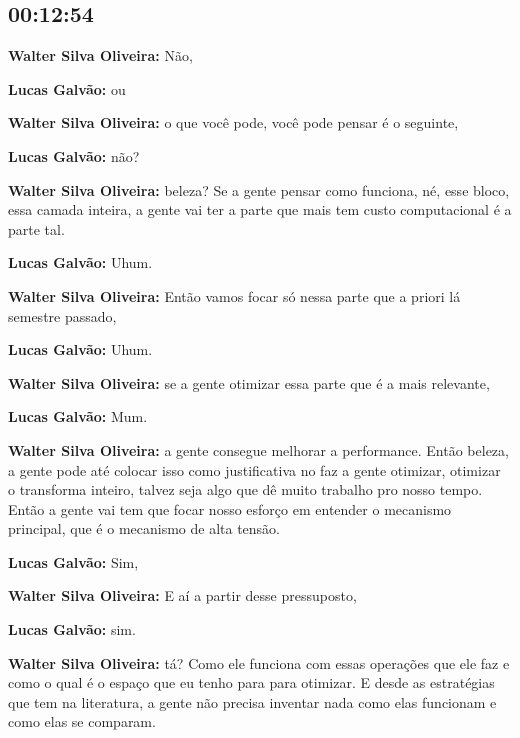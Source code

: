 \subsection{\textbf{00:12:54}}



\textbf{Walter Silva Oliveira:} Não,



\textbf{Lucas Galvão:} ou



\textbf{Walter Silva Oliveira:} o que você pode, você pode pensar é o seguinte,



\textbf{Lucas Galvão:} não?



\textbf{Walter Silva Oliveira:} beleza? Se a gente pensar como funciona, né, esse bloco, essa camada inteira, a gente vai ter a parte que mais tem custo computacional é a parte tal.



\textbf{Lucas Galvão:} Uhum.



\textbf{Walter Silva Oliveira:} Então vamos focar só nessa parte que a priori lá semestre passado,



\textbf{Lucas Galvão:} Uhum.



\textbf{Walter Silva Oliveira:} se a gente otimizar essa parte que é a mais relevante,



\textbf{Lucas Galvão:} Mum.



\textbf{Walter Silva Oliveira:} a gente consegue melhorar a performance. Então beleza, a gente pode até colocar isso como justificativa no faz a gente otimizar, otimizar o transforma inteiro, talvez seja algo que dê muito trabalho pro nosso tempo. Então a gente vai tem que focar nosso esforço em entender o mecanismo principal, que é o mecanismo de alta tensão.



\textbf{Lucas Galvão:} Sim,



\textbf{Walter Silva Oliveira:} E aí a partir desse pressuposto,



\textbf{Lucas Galvão:} sim.



\textbf{Walter Silva Oliveira:} tá? Como ele funciona com essas operações que ele faz e como o qual é o espaço que eu tenho para para otimizar. E desde as estratégias que tem na literatura, a gente não precisa inventar nada como elas funcionam e como elas se comparam.



